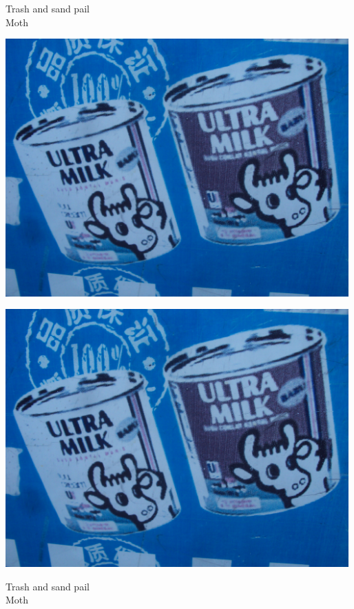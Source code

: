 \documentclass[10pt,letterpaper]{article}
\begin{document}
Trash and sand pail\\
Moth\\
\pagebreak

\includegraphics[width=5.19in]{landscape.jpg}

\vspace{0.25in}
\includegraphics[width=5.19in]{landscape.jpg}

Trash and sand pail\\
Moth\\
\pagebreak
\end{document}
